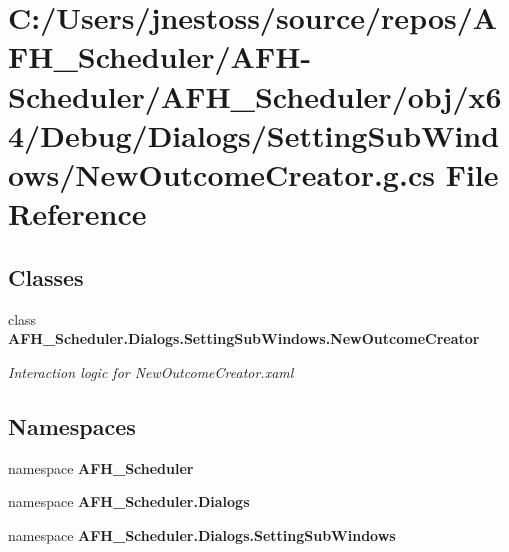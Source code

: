 \section{C\+:/\+Users/jnestoss/source/repos/\+A\+F\+H\+\_\+\+Scheduler/\+A\+F\+H-\/\+Scheduler/\+A\+F\+H\+\_\+\+Scheduler/obj/x64/\+Debug/\+Dialogs/\+Setting\+Sub\+Windows/\+New\+Outcome\+Creator.g.\+cs File Reference}
\label{x64_2_debug_2_dialogs_2_setting_sub_windows_2_new_outcome_creator_8g_8cs}
\subsection*{Classes}
\begin{DoxyCompactItemize}
\item 
class \textbf{ A\+F\+H\+\_\+\+Scheduler.\+Dialogs.\+Setting\+Sub\+Windows.\+New\+Outcome\+Creator}
\begin{DoxyCompactList}\small\item\em Interaction logic for New\+Outcome\+Creator.\+xaml \end{DoxyCompactList}\end{DoxyCompactItemize}
\subsection*{Namespaces}
\begin{DoxyCompactItemize}
\item 
namespace \textbf{ A\+F\+H\+\_\+\+Scheduler}
\item 
namespace \textbf{ A\+F\+H\+\_\+\+Scheduler.\+Dialogs}
\item 
namespace \textbf{ A\+F\+H\+\_\+\+Scheduler.\+Dialogs.\+Setting\+Sub\+Windows}
\end{DoxyCompactItemize}
